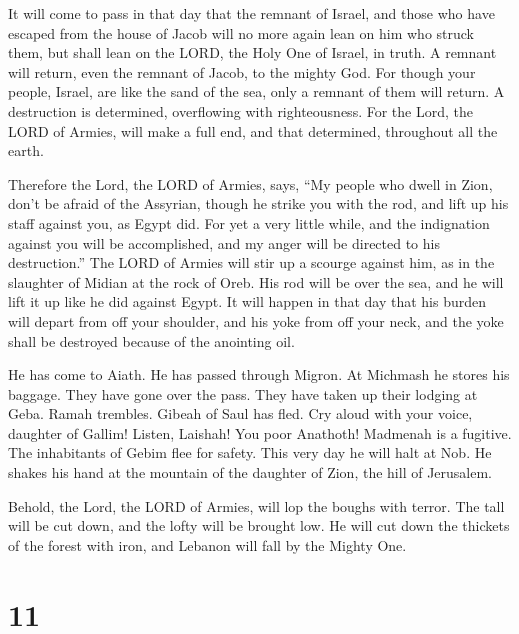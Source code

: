  It will come to pass in that day that the remnant of
Israel, and those who have escaped from the house of Jacob will no more
again lean on him who struck them, but shall lean on the LORD, the Holy
One of Israel, in truth.  A remnant will return, even the
remnant of Jacob, to the mighty God.  For though your
people, Israel, are like the sand of the sea, only a remnant of them
will return. A destruction is determined, overflowing with
righteousness.  For the Lord, the LORD of Armies, will make
a full end, and that determined, throughout all the earth.

 Therefore the Lord, the LORD of Armies, says, ``My people
who dwell in Zion, don't be afraid of the Assyrian, though he strike you
with the rod, and lift up his staff against you, as Egypt did.
 For yet a very little while, and the indignation against
you will be accomplished, and my anger will be directed to his
destruction.''  The LORD of Armies will stir up a scourge
against him, as in the slaughter of Midian at the rock of Oreb. His rod
will be over the sea, and he will lift it up like he did against Egypt.
 It will happen in that day that his burden will depart
from off your shoulder, and his yoke from off your neck, and the yoke
shall be destroyed because of the anointing oil.

 He has come to Aiath. He has passed through Migron. At
Michmash he stores his baggage.  They have gone over the
pass. They have taken up their lodging at Geba. Ramah trembles. Gibeah
of Saul has fled.  Cry aloud with your voice, daughter of
Gallim! Listen, Laishah! You poor Anathoth!  Madmenah is a
fugitive. The inhabitants of Gebim flee for safety.  This
very day he will halt at Nob. He shakes his hand at the mountain of the
daughter of Zion, the hill of Jerusalem.

 Behold, the Lord, the LORD of Armies, will lop the boughs
with terror. The tall will be cut down, and the lofty will be brought
low.  He will cut down the thickets of the forest with
iron, and Lebanon will fall by the Mighty One.

\hypertarget{section-10}{%
\section{11}\label{section-10}}

